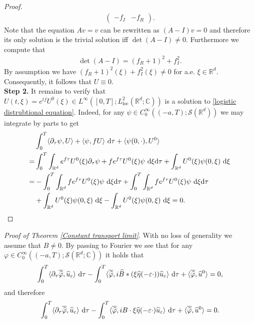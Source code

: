 \documentclass[11pt,reqno]{amsart}
\numberwithin{equation}{section}
\def\dd{{\rm d}}
\begin{document}
\begin{proof}
\begin{align*}
\begin{pmatrix}
-f_{I} & -f_{R}
\end{pmatrix}.     
\end{align*}
Note that the equation $Av=v$ can be rewritten as $(A-I)v=0$ and therefore its only solution is the trivial solution iff $\det(A-I)\neq 0$. Furthermore we compute that 
\begin{align*}
\det (A-I)=(f_{R}+1)^{2}+f_{I}^{2}.
\end{align*}
By assumption we have 
$(f_{R}+1)^{2}(\xi)+f_{I}^{2}(\xi)\neq 0$ for a.e. $\xi\in \mathbb{R}^{d}$.
Consequently, it follows that  $U\equiv 0$. \\
\textbf{Step 2.} It remains to verify that $U(t,\xi)=e^{tf}U^{0}(\xi)\in L^{\infty}([0,T];L^{2}_{\mathrm{loc}}(\mathbb{R}^{d};\mathbb{C}))$ is a solution to \eqref{logistic distrubtional equation}. Indeed, for any $\psi\in C^{\infty}_{0}((-a,T);\mathcal{S}(\mathbb{R}^{d}))$ we may integrate by parts to get  
\begin{align*}
&\int_{0}^{T}\langle \partial_{\tau}\psi,U\rangle+\langle \psi,fU\rangle\ \dd \tau+\langle \psi(0,\cdot),U^{0}\rangle\\
=&\int_{0}^{T}\int_{\mathbb{R}^{d}}e^{f\tau}U^{0}(\xi)\partial_{\tau}\psi +fe^{f\tau}U^{0}(\xi)\psi\ \dd \xi\dd \tau+\int_{\mathbb{R}^{d}}U^{0}(\xi)\psi(0,\xi)\ \dd \xi\\
=&-\int_{0}^{T}\int_{\mathbb{R}^{d}}fe^{f\tau}U^{0}(\xi)\psi
\ \dd\xi\dd \tau+\int_{0}^{T}\int_{\mathbb{R}^{d}}fe^{f\tau}U^{0}(\xi)\psi\ \dd \xi\dd \tau\\\
&+\int_{\mathbb{R}^{d}}U^{0}(\xi)\psi(0,\xi)\ \dd \xi-\int_{\mathbb{R}^{d}}U^{0}(\xi)\psi(0,\xi)\ \dd \xi=0.  
\end{align*}
\end{proof}
\textit{Proof of Theorem \ref{Constant transport limit}}. With no loss of generality we assume that $B\neq 0$. 
By passing to Fourier we see that for any $\varphi\in C^{\infty}_{0}((-a,T); \mathcal{S}(\mathbb{R}^{d};\mathbb{C}))$ it holds that  
\begin{align*}
\int_{0}^{T}\langle \partial_{\tau}\overline{\widehat{\varphi}},\widehat{u}_{\varepsilon}\rangle \ \dd \tau
-\int_{0}^{T}\langle \overline{\widehat{\varphi}},i\widehat{B}\ast (\xi\widehat{\eta}(-\varepsilon\cdot))\widehat{u}_{\varepsilon}\rangle \ \dd\tau+\langle \overline{\widehat{\varphi}},\widehat{u}^{0}\rangle =0, 
\end{align*}
and therefore 
\begin{align}
\int_{0}^{T}\langle \partial_{\tau}\overline{\widehat{\varphi}},\widehat{u}_{\varepsilon}\rangle\ \dd \tau-\int_{0}^{T}\langle \overline{\widehat{\varphi}},iB\cdot \xi\widehat{\eta}(-\varepsilon \cdot)\widehat{u}_{\varepsilon}\rangle\ \dd \tau+\langle \overline{\widehat{\varphi}},\widehat{u}^{0}\rangle=0.    
\end{align}
\end{document}
